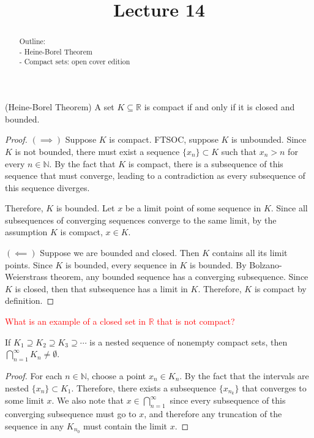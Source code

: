 \documentclass{ximera}
\begin{document}
    \title{Lecture 14}
    
    \begin{abstract}  
    Outline: \\
    - Heine-Borel Theorem \\
    - Compact sets: open cover edition
\end{abstract}

\maketitle

\begin{theorem}{(Heine-Borel Theorem)}
    A set $K \subseteq \mathbb{R}$ is compact if and only if it is closed and bounded.
\end{theorem}
\begin{proof}
    $(\implies)$ Suppose $K$ is compact.  FTSOC, suppose $K$ is unbounded.  Since $K$ is not bounded, there must exist a sequence $\{x_n\}\subset K$ such that $x_n > n$ for every $n \in \mathbb{N}$.  By the fact that $K$ is compact, there is a subsequence of this sequence that must converge, leading to a contradiction as every subsequence of this sequence diverges.

    Therefore, $K$ is bounded.  Let $x$ be a limit point of some sequence in $K$.  Since all subsequences of converging sequences converge to the same limit, by the assumption $K$ is compact, $x \in K$.

    $(\impliedby)$
    Suppose we are bounded and closed.  Then $K$ contains all its limit points.  Since $K$ is bounded, every sequence in $K$ is bounded.  By Bolzano-Weierstrass theorem, any bounded sequence has a converging subsequence.  Since $K$ is closed, then that subsequence has a limit in $K$.  Therefore, $K$ is compact by definition.
\end{proof}

\textcolor{red}{What is an example of a closed set in $\mathbb{R}$ that is not compact?}

\begin{theorem}
    If $K_1 \supseteq K_2 \supseteq K_3 \supseteq \cdots$ is a nested sequence of nonempty compact sets, then $\bigcap\limits_{n=1}^\infty K_n \neq \emptyset$.
\end{theorem}
\begin{proof}
    For each $n \in \mathbb{N}$, choose a point $x_n \in K_n$.  By the fact that the intervals are nested $\{x_n\} \subset K_1$.  Therefore, there exists a subsequence $\{x_{n_k}\}$ that converges to some limit $x$.  We also note that $x \in \bigcap\limits_{n=1}^\infty$ since every subsequence of this converging subsequence must go to $x$, and therefore any truncation of the sequence in any $K_{n_0}$ must contain the limit $x$.
\end{proof}
\end{document}
